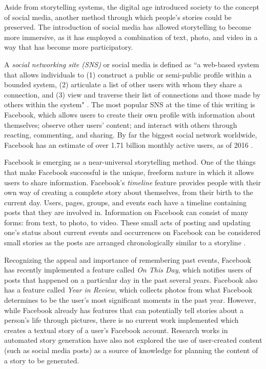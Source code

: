 Aside from storytelling systems, the digital age introduced society to the concept of social media, another method through which people's stories could be preserved. The introduction of social media has allowed storytelling to become more immersive, as it has employed a combination of text, photo, and video in a way that has become more participatory. 

A \textit{social networking site (SNS)} or social media is defined as ``a web-based system that allows individuals to (1) construct a public or semi-public profile within a bounded system, (2) articulate a list of other users with whom they share a connection, and (3) view and traverse their list of connections and those made by others within the system" \cite{BoydEllison2010}. The most popular SNS at the time of this writing is Facebook, which allows users to create their own profile with information about themselves; observe other users' content; and interact with others through reacting, commenting, and sharing. By far the biggest social network worldwide, Facebook has an estimate of over 1.71 billion monthly active users, as of 2016 \cite{Harden2016}.

Facebook is emerging as a near-universal storytelling method. One of the things that make Facebook successful is the unique, freeform nature in which it allows users to share information. Facebook's \textit{timeline} feature provides people with their own way of creating a complete story about themselves, from their birth to the current day. Users, pages, groups, and events each have a timeline containing posts that they are involved in. Information on Facebook can consist of many forms: from text, to photo, to video. These small acts of posting and updating one's status about current events and occurrences on Facebook can be considered small stories as the posts are arranged chronologically similar to a storyline \cite{West20131}. 

Recognizing the appeal and importance of remembering past events, Facebook has recently implemented a feature called \textit{On This Day}, which notifies users of posts that happened on a particular day in the past several years. Facebook also has a feature called \textit{Year in Review}, which collects photos from what Facebook determines to be the user's most significant moments in the past year. However, while Facebook already has features that can potentially tell stories about a person's life through pictures, there is no current work implemented which creates a textual story of a user's Facebook account. Research works in automated story generation have also not explored the use of user-created content (such as social media posts) as a source of knowledge for planning the content of a story to be generated.

